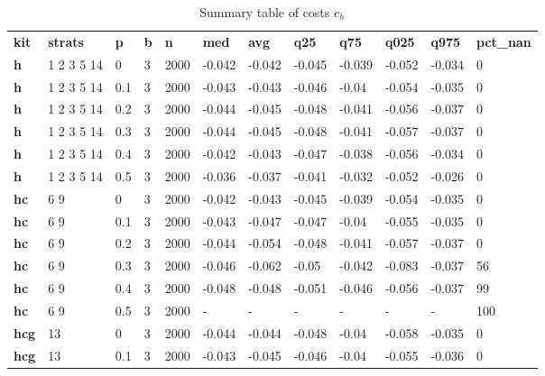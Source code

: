 \begin{longtable}[h]{|p{0.8cm}|p{1.5cm}|p{1cm}|p{1cm}|p{1cm}|p{1cm}|p{1cm}|p{1cm}|p{1cm}|p{1cm}|p{1cm}|p{1.5cm}|}
\caption{Summary table of costs $c_h$}
\label{tab:costs_mod_h} \\
      \hline
\textbf{ kit} & \textbf{ strats} & \textbf{ p} & \textbf{ b} & \textbf{ n} & \textbf{ med} & \textbf{ avg} & \textbf{ q25} & \textbf{ q75} & \textbf{ q025} & \textbf{ q975} & \textbf{ pct\_nan}
           \\
  \textbf{h   } &  1 2 3 5 14 &   0 & 3 & 2000 & -0.042 & -0.042 & -0.045 & -0.039 & -0.052 & -0.034 &   0
           \\
  \textbf{h   } &  1 2 3 5 14 & 0.1 & 3 & 2000 & -0.043 & -0.043 & -0.046 &  -0.04 & -0.054 & -0.035 &   0
           \\
  \textbf{h   } &  1 2 3 5 14 & 0.2 & 3 & 2000 & -0.044 & -0.045 & -0.048 & -0.041 & -0.056 & -0.037 &   0
           \\
  \textbf{h   } &  1 2 3 5 14 & 0.3 & 3 & 2000 & -0.044 & -0.045 & -0.048 & -0.041 & -0.057 & -0.037 &   0
           \\
  \textbf{h   } &  1 2 3 5 14 & 0.4 & 3 & 2000 & -0.042 & -0.043 & -0.047 & -0.038 & -0.056 & -0.034 &   0
           \\
  \textbf{h   } &  1 2 3 5 14 & 0.5 & 3 & 2000 & -0.036 & -0.037 & -0.041 & -0.032 & -0.052 & -0.026 &   0
           \\
  \textbf{hc  } &  6 9        &   0 & 3 & 2000 & -0.042 & -0.043 & -0.045 & -0.039 & -0.054 & -0.035 &   0
           \\
  \textbf{hc  } &  6 9        & 0.1 & 3 & 2000 & -0.043 & -0.047 & -0.047 &  -0.04 & -0.055 & -0.035 &   0
           \\
  \textbf{hc  } &  6 9        & 0.2 & 3 & 2000 & -0.044 & -0.054 & -0.048 & -0.041 & -0.057 & -0.037 &   0
           \\
  \textbf{hc  } &  6 9        & 0.3 & 3 & 2000 & -0.046 & -0.062 &  -0.05 & -0.042 & -0.083 & -0.037 &  56
           \\
  \textbf{hc  } &  6 9        & 0.4 & 3 & 2000 & -0.048 & -0.048 & -0.051 & -0.046 & -0.056 & -0.037 &  99
           \\
  \textbf{hc  } &  6 9        & 0.5 & 3 & 2000 & - & - & - & - & - & - & 100
           \\
  \textbf{hcg } &  13         &   0 & 3 & 2000 & -0.044 & -0.044 & -0.048 &  -0.04 & -0.058 & -0.035 &   0
           \\
  \textbf{hcg } &  13         & 0.1 & 3 & 2000 & -0.043 & -0.045 & -0.046 &  -0.04 & -0.055 & -0.036 &   0

\end{longtable}
